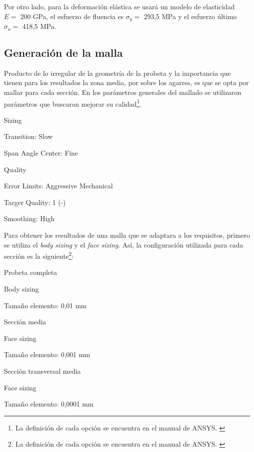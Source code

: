 Por otro lado, para la deformación elástica se usará un modelo de elasticidad $E =$ 200 GPa, el esfuerzo de fluencia es $\sigma_y=$ 293,5 MPa y el esfuerzo último $\sigma_u =$ 418,5 MPa.

\subsection{Generación de la malla}
\label{sec:gen_malla}
Producto de lo irregular de la geometría de la probeta y la importancia que tienen para los resultados la zona media, por sobre los agarres, es que se opta por mallar para cada sección. En los parámetros generales del mallado se utilizaron parámetros que buscaran mejorar su calidad\footnote{La definición de cada opción se encuentra en el manual de ANSYS. \cite{sharcnet_mesh}}.

\begin{itemize*}
	\item Sizing
		\begin{itemize*}
			\item Transition: Slow
			\item Span Angle Center: Fine
		\end{itemize*}
	\item Quality
		\begin{itemize*}
			\item Error Limits: Aggressive Mechanical
			\item Targer Quality: 1 (-)
			\item Smoothing: High
		\end{itemize*}
\end{itemize*}

Para obtener los resultados de una malla que se adaptara a los requisitos, primero se utiliza el \textit{body sizing} y el \textit{face sizing}. Así, la configuración utilizada para cada sección es la siguiente\footnote{La definición de cada opción se encuentra en el manual de ANSYS. \cite{sharcnet_mesh}}:
\begin{itemize*}
	\item Probeta completa
		\begin{itemize*}
			\item Body sizing
			\item Tamaño elemento: 0,01 mm
		\end{itemize*}
	\item Sección media
		\begin{itemize*}
			\item Face sizing
			\item Tamaño elemento: 0,001 mm
		\end{itemize*}
	\item Sección transversal media
		\begin{itemize*}
			\item Face sizing
			\item Tamaño elemento: 0,0001 mm
		\end{itemize*}
\end{itemize*}

